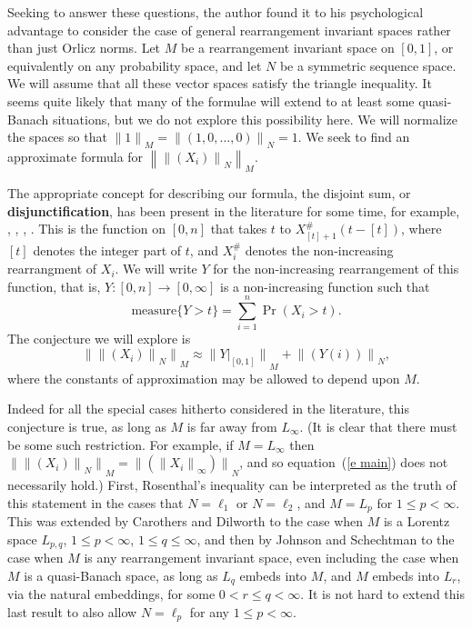 \documentclass[12pt]{amsart}
\newcommand{\normo}[1]{{\left\|#1\right\|}}
\newcommand{\snormo}[1]{{\mathopen\|#1\mathclose\|}}
\newcommand{\measure}{\text{measure}}
\begin{document}
Seeking to answer these questions, the author found it to 
his psychological
advantage to consider the case of general rearrangement invariant spaces
rather than just Orlicz norms.
Let $M$ be a rearrangement invariant space on $[0,1]$, or equivalently
on any probability space, and let $N$ be a symmetric sequence space.
We will assume that all these vector spaces 
satisfy the triangle inequality.  
It seems quite likely that many
of the formulae will extend to at least some quasi-Banach situations,
but we do not explore this possibility here.  
We will normalize the
spaces so that $\snormo 1_M = \snormo{(1,0,\dots,0)}_N = 1$.
We seek to find an approximate formula for $\normo{\normo{(X_i)}_N}_M$.

The appropriate concept for describing our formula, the disjoint sum, 
or {\bf disjunctification}, has been
present in the literature for some time, for example, 
\cite{carothers-dilworth},
\cite{hitczenko-montgomery-smith},
\cite{johnson et al},
\cite{johnson-schechtman}. 
This is the function on $[0,n]$
that takes $t$ to $X^\#_{[t]+1}(t-[t])$, 
where $[t]$ denotes the integer part of $t$, and $X^\#_i$ 
denotes the non-increasing
rearrangment of $X_i$.  
We will write $Y$ for the
non-increasing rearrangement of this function, that is, 
$Y\colon[0,n] \to [0,\infty]$ is a non-increasing
function such that
\[ 
   \measure\{Y > t \} = \sum_{i=1}^n \Pr(X_i > t) . 
\]
The conjecture we will explore is
\begin{equation}
\label{e main}
   \snormo{\snormo{(X_i)}_N}_M \approx
   \snormo{Y|_{[0,1]}}_M + \snormo{(Y(i))}_N ,
\end{equation}
where the constants of approximation may be allowed to depend upon $M$.

Indeed for all the special cases hitherto considered in the literature,
this conjecture is true,
as long as $M$ is far away from $L_\infty$.
(It is clear that there must be some such restriction.  
For example,  
if $M = L_\infty$ then $\snormo{\snormo{(X_i)}_N}_M = 
\snormo{(\snormo{X_i}_\infty)}_N$, and so equation~(\ref{e main})
does not necessarily hold.)
First, Rosenthal's
inequality \cite{rosenthal} can be interpreted
as the truth of this statement in the cases that 
$N = \ell_1$ or $N = \ell_2$,
and $M = L_p$ for $1 \le p < \infty$.  
This was extended by
Carothers and Dilworth \cite{carothers-dilworth} to the case when
$M$ is a Lorentz space $L_{p,q}$, $1 \le p < \infty$, $1 \le q \le \infty$,
and then by Johnson and Schechtman \cite{johnson-schechtman} to the case
when $M$ is any rearrangement invariant space, even including the case
when $M$ is a quasi-Banach space, as long as $L_q$ embeds into $M$, and $M$ 
embeds into $L_r$, via the natural embeddings, for some $0<r\le q < \infty$.
It is not hard to extend this last result to also allow $N = \ell_p$ for any
$1 \le p < \infty$.
\end{document}
